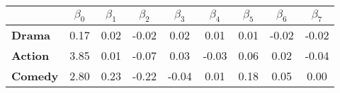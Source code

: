 \begin{tabular}{|l|c|c|c|c|c|c|c|c|}
\hline
&\textbf{$\beta_{0}$}&\textbf{$\beta_{1}$}&\textbf{$\beta_{2}$}&\textbf{$\beta_{3}$}&\textbf{$\beta_{4}$}&\textbf{$\beta_{5}$}&\textbf{$\beta_{6}$}&\textbf{$\beta_{7}$}\\\hline
\textbf{Drama}&0.17&0.02&-0.02&0.02&0.01&0.01&-0.02&-0.02\\\hline
\textbf{Action}&3.85&0.01&-0.07&0.03&-0.03&0.06&0.02&-0.04\\\hline
\textbf{Comedy}&2.80&0.23&-0.22&-0.04&0.01&0.18&0.05&0.00\\\hline
\end{tabular}
